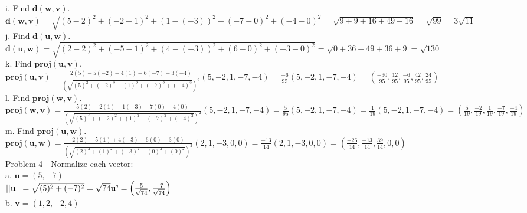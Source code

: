 \documentclass[11pt]{article}
\begin{document}
i. Find $\mathbf{d(w,v)}$. \\[5pt]

$
\mathbf{d(w,v)}
= \sqrt{(5-2)^2 + (-2-1)^2 + (1-(-3))^2 + (-7-0)^2 + (-4-0)^2}
= \sqrt{9 + 9 + 16 + 49 + 16}
= \sqrt{99}
= 3\sqrt{11}
$ \\[5pt]

j. Find $\mathbf{d(u,w)}$. \\[5pt]

$
\mathbf{d(u,w)}
= \sqrt{(2-2)^2 + (-5-1)^2 + (4-(-3))^2 + (6-0)^2 + (-3-0)^2}
= \sqrt{0 + 36 + 49 + 36 + 9}
= \sqrt{130}
$ \\[5pt]

k. Find $\mathbf{proj(u,v)}$. \\[5pt]

$
\mathbf{proj(u,v)}
= \frac{2(5)-5(-2)+4(1)+6(-7)-3(-4)}{\left(\sqrt{(5)^2+(-2)^2+(1)^2+(-7)^2+(-4)^2}\right)^2}(5,-2,1,-7,-4)
= \frac{-6}{95}(5,-2,1,-7,-4)
= (\frac{-30}{95},\frac{12}{95},\frac{-6}{95},\frac{42}{95},\frac{24}{95})
$ \\[5pt]

l. Find $\mathbf{proj(w,v)}$. \\[5pt]

$
\mathbf{proj(w,v)}
= \frac{5(2)-2(1)+1(-3)-7(0)-4(0)}{\left(\sqrt{(5)^2+(-2)^2+(1)^2+(-7)^2+(-4)^2}\right)^2}(5,-2,1,-7,-4)
= \frac{5}{95}(5,-2,1,-7,-4)
= \frac{1}{19}(5,-2,1,-7,-4)
= (\frac{5}{19},\frac{-2}{19},\frac{1}{19},\frac{-7}{19},\frac{-4}{19})
$ \\[5pt]

m. Find $\mathbf{proj(u,w)}$. \\[5pt]

$
\mathbf{proj(u,w)}
= \frac{2(2)-5(1)+4(-3)+6(0)-3(0)}{\left(\sqrt{(2)^2+(1)^2+(-3)^2+(0)^2+(0)^2}\right)^2}(2,1,-3,0,0)
= \frac{-13}{14}(2,1,-3,0,0)
= (\frac{-26}{14},\frac{-13}{14},\frac{39}{14},0,0)
$ \\[5pt]

Problem 4 - Normalize each vector: \\[5pt]

a. $\mathbf{u}=(5,-7)$ \\[5pt]

$
||\textbf{u}|| =
\sqrt{(5)^2+(-7)^2} = \sqrt{74} \\
\textbf{u'} = \left(\frac{5}{\sqrt{74}},\frac{-7}{\sqrt{74}}\right)
$ \\[5pt]


b. $\mathbf{v}=(1,2,-2,4)$ \\[5pt]
\end{document}
